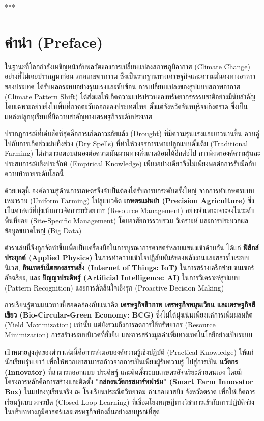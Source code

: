\documentclass[11pt,a4paper,openany]{report}
\begin{document}
***

\section{คำนำ (Preface)}


ในฐานะที่โลกกำลังเผชิญหน้ากับพลวัตของการเปลี่ยนแปลงสภาพภูมิอากาศ (Climate Change) อย่างที่ไม่เคยปรากฏมาก่อน ภาคเกษตรกรรม ซึ่งเป็นรากฐานทางเศรษฐกิจและความมั่นคงทางอาหารของประเทศ ได้รับผลกระทบอย่างรุนแรงและซับซ้อน การเปลี่ยนแปลงของรูปแบบสภาพอากาศ (Climate Pattern Shift) ได้ส่งผลให้เกิดความแปรปรวนของทรัพยากรธรรมชาติอย่างมีนัยสำคัญ โดยเฉพาะอย่างยิ่งในพื้นที่ภาคตะวันออกของประเทศไทย ตั้งแต่จังหวัดจันทบุรีจนถึงตราด ซึ่งเป็นแหล่งปลูกทุเรียนที่มีความสำคัญทางเศรษฐกิจระดับประเทศ

ปรากฏการณ์ที่เด่นชัดที่สุดคือการเกิดภาวะภัยแล้ง (Drought) ที่มีความรุนแรงและยาวนานขึ้น ควบคู่ไปกับการเกิดช่วงฝนทิ้งช่วง (Dry Spells) ที่ทำให้วงจรการเพาะปลูกแบบดั้งเดิม (Traditional Farming) ไม่สามารถตอบสนองต่อความผันผวนทางสิ่งแวดล้อมได้อีกต่อไป การพึ่งพาองค์ความรู้และประสบการณ์เชิงประจักษ์ (Empirical Knowledge) เพียงอย่างเดียวจึงไม่เพียงพอต่อการรับมือกับความท้าทายระดับโลกนี้

ด้วยเหตุนี้ องค์ความรู้ด้านการเกษตรจึงจำเป็นต้องได้รับการยกระดับครั้งใหญ่ จากการทำเกษตรแบบเหมารวม (Uniform Farming) ไปสู่แนวคิด \textbf{เกษตรแม่นยำ (Precision Agriculture)} ซึ่งเป็นศาสตร์ที่มุ่งเน้นการจัดการทรัพยากร (Resource Management) อย่างจำเพาะเจาะจงในระดับพื้นที่ย่อย (Site-Specific Management) โดยอาศัยการรวบรวม วิเคราะห์ และการประมวลผลข้อมูลขนาดใหญ่ (Big Data)

ตำราเล่มนี้จึงถูกจัดทำขึ้นเพื่อเป็นเครื่องมือในการบูรณาการศาสตร์หลายแขนงเข้าด้วยกัน ได้แก่ \textbf{ฟิสิกส์ประยุกต์ (Applied Physics)} ในการทำความเข้าใจปฏิสัมพันธ์ของพลังงานและสสารในระบบนิเวศ, \textbf{อินเทอร์เน็ตของสรรพสิ่ง (Internet of Things: IoT)} ในการสร้างเครือข่ายเซนเซอร์อัจฉริยะ, และ \textbf{ปัญญาประดิษฐ์ (Artificial Intelligence: AI)} ในการวิเคราะห์รูปแบบ (Pattern Recognition) และการตัดสินใจเชิงรุก (Proactive Decision Making)

การเรียนรู้ตามแนวทางนี้สอดคล้องกับแนวคิด \textbf{เศรษฐกิจชีวภาพ เศรษฐกิจหมุนเวียน และเศรษฐกิจสีเขียว (Bio-Circular-Green Economy: BCG)} ซึ่งไม่ได้มุ่งเน้นเพียงแค่การเพิ่มผลผลิต (Yield Maximization) เท่านั้น แต่ยังรวมถึงการลดการใช้ทรัพยากร (Resource Minimization) การสร้างระบบนิเวศที่ยั่งยืน และการสร้างมูลค่าเพิ่มทางเทคโนโลยีอย่างเป็นระบบ

เป้าหมายสูงสุดของตำราเล่มนี้คือการส่งมอบองค์ความรู้เชิงปฏิบัติ (Practical Knowledge) ให้แก่นักเรียนรุ่นเยาว์ เพื่อให้พวกเขาสามารถก้าวจากการเป็นเพียงผู้รับความรู้ ไปสู่การเป็น \textbf{นวัตกร (Innovator)} ที่สามารถออกแบบ ประดิษฐ์ และติดตั้งระบบเกษตรอัจฉริยะด้วยตนเอง โดยมีโครงการหลักคือการสร้างและติดตั้ง \textbf{"กล่องนวัตกรสมาร์ทฟาร์ม" (Smart Farm Innovator Box)} ในแปลงทุเรียนจริง ณ โรงเรียนประณีตวิทยาคม อำเภอเขาสมิง จังหวัดตราด เพื่อให้เกิดการเรียนรู้แบบวงจรปิด (Closed-Loop Learning) ที่เชื่อมโยงทฤษฎีทางวิชาการเข้ากับการปฏิบัติจริงในบริบททางภูมิศาสตร์และเศรษฐกิจท้องถิ่นอย่างสมบูรณ์ที่สุด
\end{document}
